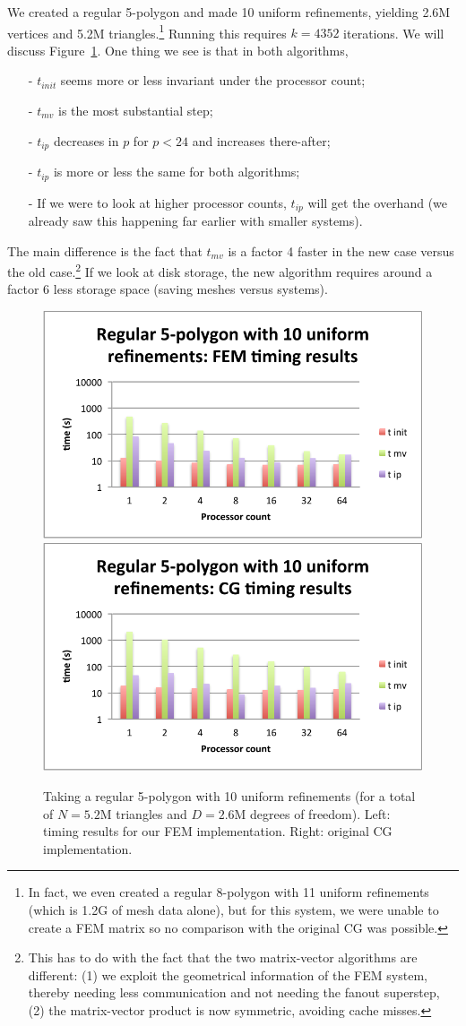 \documentclass[11pt]{amsart}
\theoremstyle{definition}
\begin{document}
We created a regular 5-polygon and made 10 uniform refinements, yielding 2.6M vertices and 5.2M triangles.\footnote{In fact, we even created a regular 8-polygon with 11 uniform refinements (which is 1.2G of mesh data alone), but for this system, we were unable to create a FEM matrix so no comparison with the original CG was possible.} Running this requires $k=4352$ iterations. We will discuss Figure~\ref{fig:baazen}. One thing we see is that in both algorithms, 
\begin{itemize}
  \item[-] $t_{init}$ seems more or less invariant under the processor count; 
  \item[-] $t_{mv}$ is the most substantial step;
  \item[-] $t_{ip}$ decreases in $p$ for $p < 24$ and increases there-after;
  \item[-] $t_{ip}$ is more or less the same for both algorithms;
  \item[-] If we were to look at higher processor counts, $t_{ip}$ will get the overhand (we already saw this happening far earlier with smaller systems).
\end{itemize}
The main difference is the fact that $t_{mv}$ is a factor 4 faster in the new case versus the old case.\footnote{This has to do with the fact that the two matrix-vector algorithms are different: (1) we exploit the geometrical information of the FEM system, thereby needing less communication and not needing the fanout superstep, (2) the matrix-vector product is now symmetric, avoiding cache misses.} If we look at disk storage, the new algorithm requires around a factor 6 less storage space (saving meshes versus systems).

\begin{figure}
  \includegraphics[width=0.48\linewidth]{baazen_fem.pdf}
  \includegraphics[width=0.48\linewidth]{baazen_cg.pdf}
  \caption{Taking a regular 5-polygon with 10 uniform refinements (for a total of $N = 5.2$M triangles and $D = 2.6$M degrees of freedom). Left: timing results for our FEM implementation. Right: original CG implementation.}
  \label{fig:baazen}
\end{figure}
\end{document}
